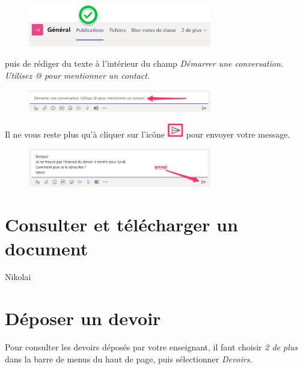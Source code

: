 \begin{figure}[h]
\includegraphics[width=8cm]{./images/teams/publications}
\centering
\end{figure}

puis de rédiger du texte à l'intérieur du champ \textit{Démarrer une conversation. Utilisez @ pour mentionner un contact.}

\begin{figure}[h]
\includegraphics[width=8cm]{./images/teams/publications2}
\centering
\end{figure}

Il ne vous reste plus qu'à cliquer sur l'icône \includegraphics[width=0.7cm]{./images/teams/envoi_message} pour envoyer votre message.

\begin{figure}[h]
\includegraphics[width=8cm]{./images/teams/publications3}
\centering
\end{figure}





\section{Consulter et télécharger un document}

Nikolai

\section{Déposer un devoir}

Pour consulter les devoirs déposés par votre enseignant, il faut choisir \textit{2 de plus} dans la barre de menus du haut de page, puis sélectionner \textit{Devoirs}.\\


